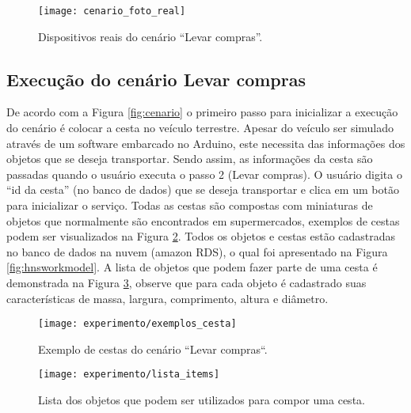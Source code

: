 \begin{figure}[!htb] \centering 
  \centering
  \texttt{[image: cenario\_foto\_real]} 
  \caption{Dispositivos reais do cenário ``Levar compras''.} 
  \label{fig:cenario_real}
\end{figure} 

\subsection{Execução do cenário Levar compras}
De acordo com a Figura \ref{fig:cenario} o primeiro passo para inicializar a execução do cenário é colocar a cesta no veículo terrestre. Apesar do veículo ser simulado através de um software embarcado no Arduino, este necessita das informações dos objetos que se deseja transportar. Sendo assim, as informações da cesta são passadas quando o usuário executa o passo 2 (Levar compras). O usuário digita o ``id da cesta'' (no banco de dados) que se deseja transportar e clica em um botão para inicializar o serviço. Todas as cestas são compostas com miniaturas de objetos que normalmente são encontrados em supermercados, exemplos de cestas podem ser visualizados na Figura \ref{fig:exemplos_cesta}. Todos os objetos e cestas estão cadastradas no banco de dados na nuvem (amazon RDS\footnotemark {}), o qual foi apresentado na Figura \ref{fig:hnsworkmodel}. A lista de objetos que podem fazer parte de uma cesta é demonstrada na Figura \ref{fig:lista_objetos}, observe que para cada objeto é cadastrado suas características de massa, largura, comprimento, altura e diâmetro.

\begin{figure}[!htb] \centering 
  \centering
  \texttt{[image: experimento/exemplos\_cesta]} 
  \caption{Exemplo de cestas do cenário ``Levar compras``.} 
  \label{fig:exemplos_cesta}
\end{figure}

\begin{figure}[!htb] \centering 
  \centering
  \texttt{[image: experimento/lista\_items]} 
  \caption{Lista dos objetos que podem ser utilizados para compor uma cesta.} 
  \label{fig:lista_objetos}
\end{figure}

